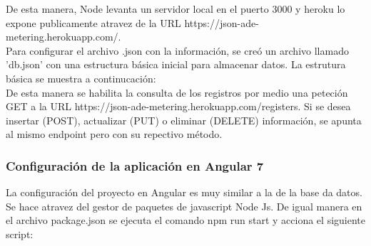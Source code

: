             
            
            De esta manera, Node levanta un servidor local en el puerto 3000 y heroku lo expone publicamente atravez de la URL https://json-ade-metering.herokuapp.com/.\\
            Para configurar el archivo .json con la información, se creó un archivo llamado 'db.json' con una estructura básica inicial para almacenar datos. La estrutura básica se muestra a continucación:\\
            De esta manera se habilita la consulta de los registros por medio una peteción GET a la URL https://json-ade-metering.herokuapp.com/registers. Si se desea insertar (POST), actualizar (PUT) o eliminar (DELETE) información, se apunta al mismo endpoint pero con su repectivo método.

        \subsubsection{Configuración de la aplicación en Angular 7}

            La configuración del proyecto en Angular es muy similar a la de la base da datos. Se hace atravez del gestor de paquetes de javascript Node Js. De igual manera en el archivo package.json se ejecuta el comando npm run start y acciona el siguiente script:

            
            
